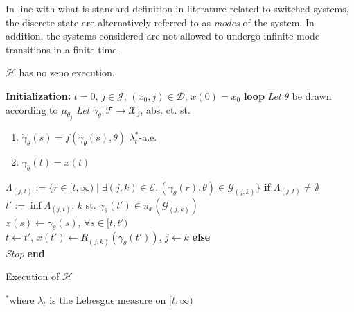 In line with what is standard definition in literature related to switched systems, the discrete state are alternatively referred to as {\em modes} of the system. In addition, the systems considered are not allowed to undergo infinite mode transitions in a finite time.
\begin{assump}
  $\mathcal H$ has no zeno execution.
\end{assump}
\begin{algorithm}[!t]
 {\bf Initialization:} $t=0,\,j\in \mathcal J,\,(x_0,j)\in \mathcal D,\,x(0)=x_0$\;
 {\bf loop}\newline
 {\em Let} $\theta$ be drawn according to $\mu_{\theta_j}$\newline
 {\em Let} $\gamma_\theta\colon \mathcal T\rightarrow \mathcal X_j$, abs. ct. st.
 \begin{enumerate}
 \item $\dot \gamma_\theta(s)=f(\gamma_\theta(s),\theta)$ $\lambda_t^*$-a.e.
 \item $\gamma_\theta(t)=x(t)$
  \end{enumerate}
 $\Lambda_{(j,t)}:=\{r\in [t,\infty)\mid \exists (j,k)\in \mathcal E, (\gamma_\theta(r),\theta)\in \mathcal G_{(j,k)}\}$\newline
 {\bf if} $\Lambda_{(j,t)}\ne \emptyset$\\\hspace{.2in}
    $t':=\inf \Lambda_{(j,t)}$, $k$ st. $\gamma_\theta(t')\in \pi_{x}(\mathcal G_{(j,k)})$\\\hspace{.2in}
     $x(s)\leftarrow \gamma_\theta(s)$, $\forall s\in [t,t')$\\ \hspace{.2in}
    $t\leftarrow t',\,x(t')\leftarrow R_{(j,k)}(\gamma_\theta(t')),\,j\leftarrow k$\newline
 {\bf else}\\\hspace{.2in}
 {\em Stop}\newline
 {\bf end}
 \caption{Execution of $\mathcal H$}
 \label{alg:execution}
 $^*$where $\lambda_t$ is the Lebesgue measure on $[t,\infty)$
\end{algorithm}

